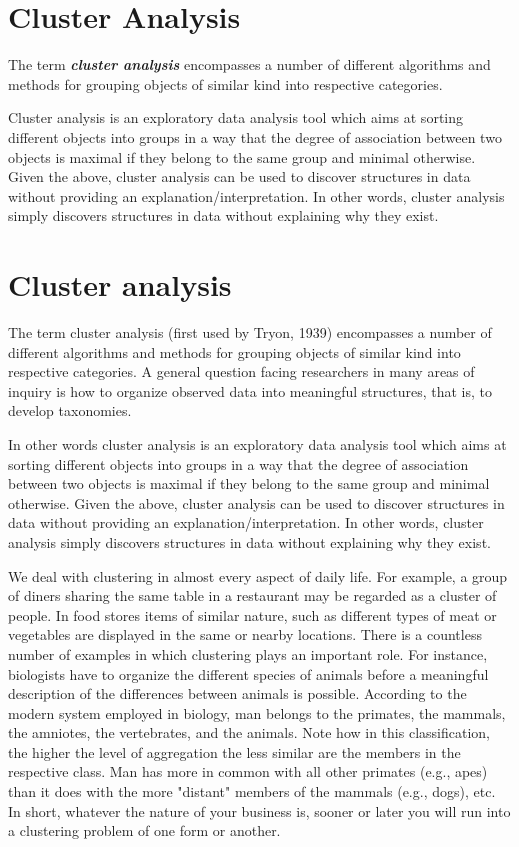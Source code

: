 \documentclass[a4paper,12pt]{article}
\begin{document}
\section*{Cluster Analysis}
The term \textit{\textbf{cluster analysis }}encompasses a number of different algorithms and methods for grouping objects of similar kind into respective categories. 

Cluster analysis is an exploratory data analysis tool which aims at sorting different objects into groups in a way that the degree of association between two objects is maximal if they belong to the same group and minimal otherwise. Given the above, cluster analysis can be used to discover structures in data without providing an explanation/interpretation. In other words, cluster analysis simply discovers structures in data without explaining why they exist.

\section{Cluster analysis}

The term cluster analysis (first used by Tryon, 1939) encompasses a number of different algorithms and methods for grouping objects of similar kind into respective categories. A general question facing researchers in many areas of inquiry is how to organize observed data into meaningful structures, that is, to develop taxonomies. 


In other words cluster analysis is an exploratory data analysis tool which aims at sorting different objects into groups in a way that the degree of association between two objects is maximal if they belong to the same group and minimal otherwise. Given the above, cluster analysis can be used to discover structures in data without providing an explanation/interpretation. In other words, cluster analysis simply discovers structures in data without explaining why they exist.


We deal with clustering in almost every aspect of daily life. For example, a group of diners sharing the same table in a restaurant may be regarded as a cluster of people. In food stores items of similar nature, such as different types of meat or vegetables are displayed in the same or nearby locations. There is a countless number of examples in which clustering plays an important role. For instance, biologists have to organize the different species of animals before a meaningful description of the differences between animals is possible. According to the modern system employed in biology, man belongs to the primates, the mammals, the amniotes, the vertebrates, and the animals. Note how in this classification, the higher the level of aggregation the less similar are the members in the respective class. Man has more in common with all other primates (e.g., apes) than it does with the more "distant" members of the mammals (e.g., dogs), etc. In short, whatever the nature of your business is, sooner or later you will run into a clustering problem of one form or another.
\end{document}
